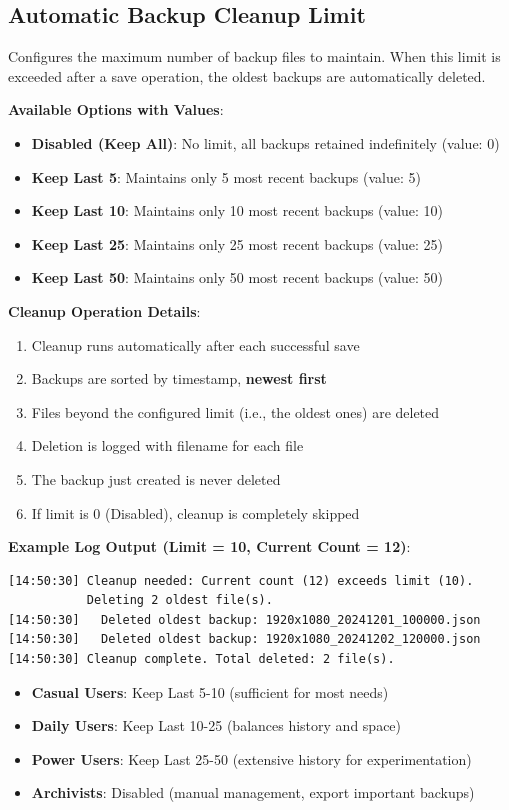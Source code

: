\documentclass[a4paper,11pt]{article}
\begin{document}
\subsection{Automatic Backup Cleanup Limit}

Configures the maximum number of backup files to maintain. When this
limit is exceeded after a save operation, the oldest backups are
automatically deleted.

\textbf{Available Options with Values}:
\begin{itemize}
  \item \textbf{Disabled (Keep All)}: No limit, all backups retained
    indefinitely (value: 0)
  \item \textbf{Keep Last 5}: Maintains only 5 most recent backups (value: 5)
  \item \textbf{Keep Last 10}: Maintains only 10 most recent backups (value: 10)
  \item \textbf{Keep Last 25}: Maintains only 25 most recent backups (value: 25)
  \item \textbf{Keep Last 50}: Maintains only 50 most recent backups (value: 50)
\end{itemize}

\textbf{Cleanup Operation Details}:
\begin{enumerate}
  \item Cleanup runs automatically after each successful save
  \item Backups are sorted by timestamp, \textbf{newest first}
  \item Files beyond the configured limit (i.e., the oldest ones) are deleted
  \item Deletion is logged with filename for each file
  \item The backup just created is never deleted
  \item If limit is 0 (Disabled), cleanup is completely skipped
\end{enumerate}

\textbf{Example Log Output (Limit = 10, Current Count = 12)}:
\begin{verbatim}
[14:50:30] Cleanup needed: Current count (12) exceeds limit (10).
           Deleting 2 oldest file(s).
[14:50:30]   Deleted oldest backup: 1920x1080_20241201_100000.json
[14:50:30]   Deleted oldest backup: 1920x1080_20241202_120000.json
[14:50:30] Cleanup complete. Total deleted: 2 file(s).
\end{verbatim}

\begin{infobox}
  \begin{itemize}
    \item \textbf{Casual Users}: Keep Last 5-10 (sufficient for most needs)
    \item \textbf{Daily Users}: Keep Last 10-25 (balances history and space)
    \item \textbf{Power Users}: Keep Last 25-50 (extensive history
      for experimentation)
    \item \textbf{Archivists}: Disabled (manual management, export
      important backups)
  \end{itemize}
\end{infobox}
\end{document}
